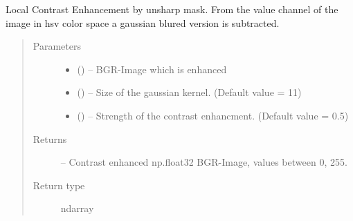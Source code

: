 \documentclass[letterpaper,10pt,english]{sphinxmanual}
\begin{document}
\begin{fulllineitems}
\label{\detokenize{image_helpers:image_helpers.lce}}
Local Contrast Enhancement by unsharp mask.
From the value channel of the image in hsv color space a gaussian blured
version is subtracted.
\begin{quote}\begin{description}
\item[{Parameters}] \leavevmode\begin{itemize}
\item {} 
 () -- BGR-Image which is enhanced

\item {} 
 () -- Size of the gaussian kernel. (Default value = 11)

\item {} 
 () -- Strength of the contrast enhancment. (Default value = 0.5)

\end{itemize}

\item[{Returns}] \leavevmode
{} -- Contrast enhanced np.float32 BGR-Image, values between 0, 255.

\item[{Return type}] \leavevmode
ndarray

\end{description}\end{quote}

\end{fulllineitems}

\end{document}
